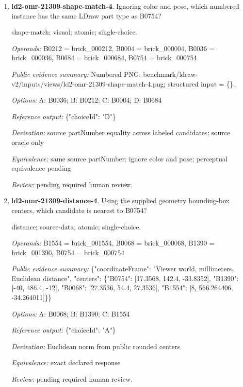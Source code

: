 \begin{enumerate}
\par{\small color; visual; atomic; single-choice.\par\textit{Operands:} B0754 = brick\_000754\par\textit{Public evidence summary:} Numbered PNG: benchmark/ldraw-v2/inputs/views/ld2-omr-21309-color-4.png; structured input = \{\}.\par\textit{Options:} A: Pearl Gold; B: Black; C: Light Bluish Grey; D: Green\par\textit{Reference output:} \{"choiceId": "C"\}\par\textit{Derivation:} source colorName by rendered B-label; source oracle only\par\textit{Equivalence:} exact declared response\par\textit{Review:} pending required human review.}
\item \textbf{ld2-omr-21309-shape-match-4}. Ignoring color and pose, which numbered instance has the same LDraw part type as B0754?
\par{\small shape-match; visual; atomic; single-choice.\par\textit{Operands:} B0212 = brick\_000212, B0004 = brick\_000004, B0036 = brick\_000036, B0684 = brick\_000684, B0754 = brick\_000754\par\textit{Public evidence summary:} Numbered PNG: benchmark/ldraw-v2/inputs/views/ld2-omr-21309-shape-match-4.png; structured input = \{\}.\par\textit{Options:} A: B0036; B: B0212; C: B0004; D: B0684\par\textit{Reference output:} \{"choiceId": "D"\}\par\textit{Derivation:} source partNumber equality across labeled candidates; source oracle only\par\textit{Equivalence:} same source partNumber; ignore color and pose; perceptual equivalence pending\par\textit{Review:} pending required human review.}
\item \textbf{ld2-omr-21309-distance-4}. Using the supplied geometry bounding-box centers, which candidate is nearest to B0754?
\par{\small distance; source-data; atomic; single-choice.\par\textit{Operands:} B1554 = brick\_001554, B0068 = brick\_000068, B1390 = brick\_001390, B0754 = brick\_000754\par\textit{Public evidence summary:} \{"coordinateFrame": "Viewer world, millimeters, Euclidean distance", "centers": \{"B0754": [17.3568, 142.4, -33.8352], "B1390": [-40, 486.4, -12], "B0068": [27.3536, 54.4, 27.3536], "B1554": [8, 566.264406, -34.264011]\}\}\par\textit{Options:} A: B0068; B: B1390; C: B1554\par\textit{Reference output:} \{"choiceId": "A"\}\par\textit{Derivation:} Euclidean norm from public rounded centers\par\textit{Equivalence:} exact declared response\par\textit{Review:} pending required human review.}

\end{enumerate}
